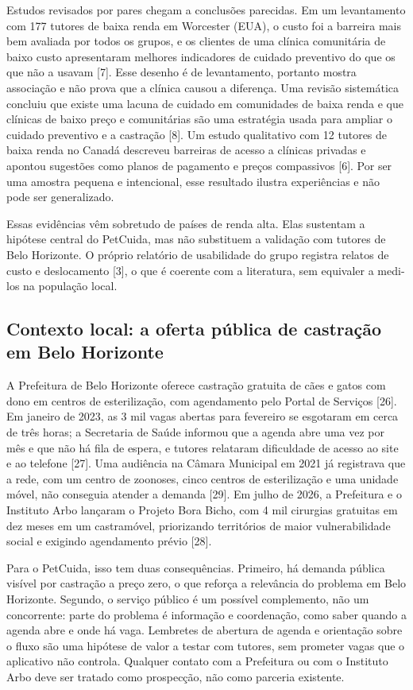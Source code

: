 \documentclass[12pt,a4paper]{article}
\begin{document}
Estudos revisados por pares chegam a conclusões parecidas. Em um levantamento com 177 tutores de baixa renda em Worcester (EUA), o custo foi a barreira mais bem avaliada por todos os grupos, e os clientes de uma clínica comunitária de baixo custo apresentaram melhores indicadores de cuidado preventivo do que os que não a usavam [7]. Esse desenho é de levantamento, portanto mostra associação e não prova que a clínica causou a diferença. Uma revisão sistemática concluiu que existe uma lacuna de cuidado em comunidades de baixa renda e que clínicas de baixo preço e comunitárias são uma estratégia usada para ampliar o cuidado preventivo e a castração [8]. Um estudo qualitativo com 12 tutores de baixa renda no Canadá descreveu barreiras de acesso a clínicas privadas e apontou sugestões como planos de pagamento e preços compassivos [6]. Por ser uma amostra pequena e intencional, esse resultado ilustra experiências e não pode ser generalizado.

Essas evidências vêm sobretudo de países de renda alta. Elas sustentam a hipótese central do PetCuida, mas não substituem a validação com tutores de Belo Horizonte. O próprio relatório de usabilidade do grupo registra relatos de custo e deslocamento [3], o que é coerente com a literatura, sem equivaler a medi-los na população local.

\subsection{Contexto local: a oferta pública de castração em Belo Horizonte}

A Prefeitura de Belo Horizonte oferece castração gratuita de cães e gatos com dono em centros de esterilização, com agendamento pelo Portal de Serviços [26]. Em janeiro de 2023, as 3 mil vagas abertas para fevereiro se esgotaram em cerca de três horas; a Secretaria de Saúde informou que a agenda abre uma vez por mês e que não há fila de espera, e tutores relataram dificuldade de acesso ao site e ao telefone [27]. Uma audiência na Câmara Municipal em 2021 já registrava que a rede, com um centro de zoonoses, cinco centros de esterilização e uma unidade móvel, não conseguia atender a demanda [29]. Em julho de 2026, a Prefeitura e o Instituto Arbo lançaram o Projeto Bora Bicho, com 4 mil cirurgias gratuitas em dez meses em um castramóvel, priorizando territórios de maior vulnerabilidade social e exigindo agendamento prévio [28].

Para o PetCuida, isso tem duas consequências. Primeiro, há demanda pública visível por castração a preço zero, o que reforça a relevância do problema em Belo Horizonte. Segundo, o serviço público é um possível complemento, não um concorrente: parte do problema é informação e coordenação, como saber quando a agenda abre e onde há vaga. Lembretes de abertura de agenda e orientação sobre o fluxo são uma hipótese de valor a testar com tutores, sem prometer vagas que o aplicativo não controla. Qualquer contato com a Prefeitura ou com o Instituto Arbo deve ser tratado como prospecção, não como parceria existente.
\end{document}
